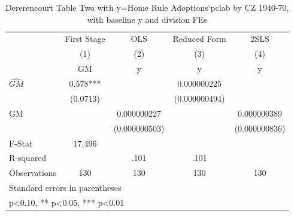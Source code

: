 \begin{table}[htbp]\centering
\def\sym#1{\ifmmode^{#1}\else\(^{#1}\)\fi}
\caption{Dererencourt Table Two with y=Home Rule Adoptions`pclab by CZ 1940-70, with baseline y and division FEs}
\begin{tabular}{l*{4}{c}}
\toprule
                    & First Stage   &         OLS   &Reduced Form   &        2SLS   \\
                    &\multicolumn{1}{c}{(1)}&\multicolumn{1}{c}{(2)}&\multicolumn{1}{c}{(3)}&\multicolumn{1}{c}{(4)}\\
                    &\multicolumn{1}{c}{GM}&\multicolumn{1}{c}{y}&\multicolumn{1}{c}{y}&\multicolumn{1}{c}{y}\\
\midrule
$\hat{GM}$          &       0.578***&               & 0.000000225   &               \\
                    &    (0.0713)   &               &(0.000000494)   &               \\
\addlinespace
GM                  &               & 0.000000227   &               & 0.000000389   \\
                    &               &(0.000000503)   &               &(0.000000836)   \\
\midrule
F-Stat              &      17.496   &               &               &               \\
R-squared           &               &        .101   &        .101   &               \\
Observations        &         130   &         130   &         130   &         130   \\
\bottomrule
\multicolumn{5}{l}{\footnotesize Standard errors in parentheses}\\
\multicolumn{5}{l}{\footnotesize * p<0.10, ** p<0.05, *** p<0.01}\\
\end{tabular}
\end{table}
